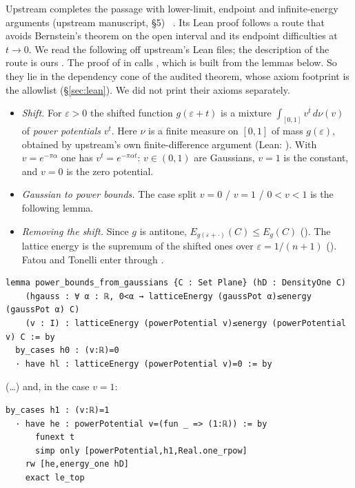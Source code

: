 Upstream completes the passage with lower-limit, endpoint and infinite-energy arguments (upstream manuscript, \S5)
\tierL{}~\cite{oai}. Its Lean proof follows a route that avoids Bernstein's theorem on the open interval and its endpoint
difficulties at $t\to0$. We read the following off upstream's Lean files; the description of the route is ours
\tierC{}. The proof of  in  calls
, which is built from the lemmas below. So they lie in the dependency cone of
the audited theorem, whose axiom footprint is the allowlist (\S\ref{sec:lean}). We did not print their axioms
separately.
\begin{itemize}
\item \emph{Shift.} For $\varepsilon>0$ the shifted function $g(\varepsilon+t)$ is a mixture
$\int_{[0,1]}v^t\,d\nu(v)$ of \emph{power potentials} $v^t$. Here $\nu$ is a finite measure on $[0,1]$ of mass
$g(\varepsilon)$, obtained by upstream's own finite-difference argument (Lean: ). With
$v=e^{-\pi\alpha}$ one has $v^t=e^{-\pi\alpha t}$: $v\in(0,1)$ are Gaussians, $v=1$ is the constant, and $v=0$ is the
zero potential.
\item \emph{Gaussian to power bounds.} The case split $v=0$ / $v=1$ / $0<v<1$ is the following lemma.
\item \emph{Removing the shift.} Since $g$ is antitone, $E_{g(\varepsilon+\cdot)}(C)\le E_g(C)$
(). The lattice energy is the supremum of the shifted ones over $\varepsilon=1/(n+1)$
(). Fatou and Tonelli enter through .
\end{itemize}

\begin{leanbox}
\begin{lstlisting}[language=Lean]
lemma power_bounds_from_gaussians {C : Set Plane} (hD : DensityOne C)
    (hgauss : ∀ α : ℝ, 0<α → latticeEnergy (gaussPot α)≤energy (gaussPot α) C)
    (v : I) : latticeEnergy (powerPotential v)≤energy (powerPotential v) C := by
  by_cases h0 : (v:ℝ)=0
  · have hl : latticeEnergy (powerPotential v)=0 := by
\end{lstlisting}
(\dots) and, in the case $v=1$:
\begin{lstlisting}[language=Lean]
  by_cases h1 : (v:ℝ)=1
  · have he : powerPotential v=(fun _ => (1:ℝ)) := by
      funext t
      simp only [powerPotential,h1,Real.one_rpow]
    rw [he,energy_one hD]
    exact le_top
\end{lstlisting}
\end{leanbox}

